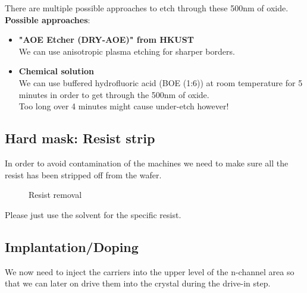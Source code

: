 There are multiple possible approaches to etch through these 500nm of oxide.\\

\textbf{Possible approaches}:
\begin{itemize}
	\item \textbf{"AOE Etcher (DRY-AOE)" from HKUST} \\
	We can use anisotropic plasma etching for sharper borders.
	\item \textbf{Chemical solution} \\
	We can use buffered hydrofluoric acid (BOE (1:6)) at room temperature for 5 minutes in order to get through the 500nm of oxide.\\
	Too long over 4 minutes might cause under-etch however!
\end{itemize}

\subsection{Hard mask: Resist strip}

In order to avoid contamination of the machines we need to make sure all the resist has been stripped off from the wafer.

\begin{figure}[H]
	\centering
	\begin{tikzpicture}[node distance = 3cm, auto, thick,scale=\CrossSectionOnly, every node/.style={transform shape}]
		
	\end{tikzpicture}
	\drawStepArrow{}
	\begin{tikzpicture}[node distance = 3cm, auto, thick,scale=\CrossSectionOnly, every node/.style={transform shape}]
		
	\end{tikzpicture}
	\caption{Resist removal}
\end{figure}
Please just use the solvent for the specific resist.

\newpage

\subsection{Implantation/Doping}\label{pwell_implant_step}
We now need to inject the carriers into the upper level of the n-channel area so that we can later on drive them into the crystal during the drive-in step.


